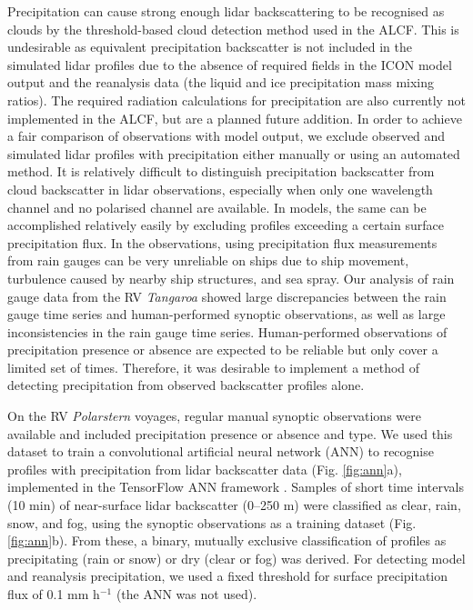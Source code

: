 \documentclass[12pt,a4paper]{article}
\begin{document}
Precipitation can cause strong enough lidar backscattering to be recognised as
clouds by the threshold-based cloud detection method used in the ALCF. This is
undesirable as equivalent precipitation backscatter is not included in the
simulated lidar profiles due to the absence of required fields in the ICON model
output and the reanalysis data (the liquid and ice precipitation mass mixing
ratios). The required radiation calculations for precipitation are also
currently not implemented in the ALCF, but are a planned future
addition.  In order to achieve a fair comparison of observations with model
output, we exclude observed and simulated lidar profiles with precipitation
either manually or using an automated method. It is relatively difficult to
distinguish precipitation backscatter from cloud backscatter in lidar
observations, especially when only one wavelength channel and no polarised
channel are available. In models, the same can be accomplished relatively
easily by excluding profiles exceeding a certain surface precipitation flux. In
the observations, using precipitation flux measurements from rain gauges can be
very unreliable on ships due to ship movement, turbulence caused by nearby ship
structures, and sea spray. Our analysis of rain gauge data from the RV
\emph{Tangaroa} showed large discrepancies between the rain gauge time series
and human-performed synoptic observations, as well as large inconsistencies in
the rain gauge time series. Human-performed observations of precipitation
presence or absence are expected to be reliable but only cover a limited set of
times. Therefore, it was desirable to implement a method of detecting
precipitation from observed backscatter profiles alone.

On the RV \emph{Polarstern} voyages, regular manual synoptic
observations were available and included precipitation presence or absence and
type. We used this dataset to train a convolutional artificial neural network
(ANN) to recognise profiles with precipitation from lidar backscatter data (Fig.
\ref{fig:ann}a), implemented in the TensorFlow ANN framework
\citep{tensorflow}. Samples of short time intervals (10 min) of near-surface
lidar backscatter (0–250 m) were classified as clear, rain, snow, and fog,
using the synoptic observations as a training dataset (Fig.  \ref{fig:ann}b).
From these, a binary, mutually exclusive classification of profiles as
precipitating (rain or snow) or dry (clear or fog) was derived. For detecting
model and reanalysis precipitation, we used a fixed threshold for surface
precipitation flux of 0.1 mm h$^{-1}$ (the ANN was not used).
\end{document}
